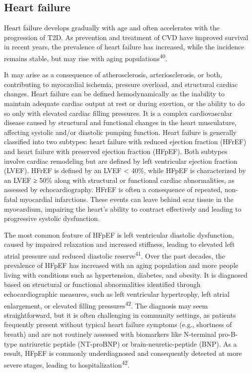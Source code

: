 \documentclass[
  a4paper,
  headsepline=true,
  open=any]{scrbook}
\begin{document}
\hypertarget{heart-failure}{%
\subsection{Heart failure}\label{heart-failure}}

Heart failure develops gradually with age and often accelerates with the
progression of T2D. As prevention and treatment of CVD have improved
survival in recent years, the prevalence of heart failure has increased,
while the incidence remains stable, but may rise with aging
populations\textsuperscript{40}.

It may arise as a consequence of atherosclerosis, arteriosclerosis, or
both, contributing to myocardial ischemia, pressure overload, and
structural cardiac changes. Heart failure can be defined hemodynamically
as the inability to maintain adequate cardiac output at rest or during
exertion, or the ability to do so only with elevated cardiac filling
pressures. It is a complex cardiovascular disease caused by structural
and functional changes in the heart musculature, affecting systolic
and/or diastolic pumping function. Heart failure is generally classified
into two subtypes: heart failure with reduced ejection fraction (HFrEF)
and heart failure with preserved ejection fraction (HFpEF). Both
subtypes involve cardiac remodeling but are defined by left ventricular
ejection fraction (LVEF). HFrEF is defined by an LVEF \textless{} 40\%,
while HFpEF is characterized by an LVEF ≥ 50\% along with structural or
functional cardiac abnormalities, as assessed by echocardiography. HFrEF
is often a consequence of repeated, non-fatal myocardial infarctions.
These events can leave behind scar tissue in the myocardium, impairing
the heart's ability to contract effectively and leading to progressive
systolic dysfunction.

The most common feature of HFpEF is left ventricular diastolic
dysfunction, caused by impaired relaxation and increased stiffness,
leading to elevated left atrial pressure and reduced diastolic
reserve\textsuperscript{41}. Over the past decades, the prevalence of
HFpEF has increased with an aging population and more people living with
conditions such as hypertension, diabetes, and obesity. It is diagnosed
based on structural or functional abnormalities identified through
echocardiographic measures, such as left ventricular hypertrophy, left
atrial enlargement, or elevated filling pressures\textsuperscript{42}.
The diagnosis may seem straightforward, but it is often challenging in
community settings, as patients frequently present without typical heart
failure symptoms (e.g., shortness of breath) and are not routinely
assessed with biomarkers like N-terminal pro-B-type natriuretic peptide
(NT-proBNP) or brain-neuretic-peptide (BNP). As a result, HFpEF is
commonly underdiagnosed and consequently detected at more severe stages,
leading to hospitalization\textsuperscript{42}.
\end{document}
